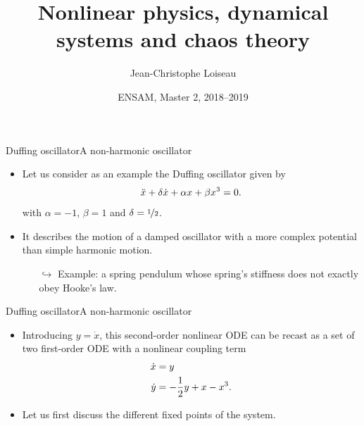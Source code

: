\documentclass[usenames,dvipsnames,svgnames,10pt,aspectratio=169]{beamer}
\title[Nonlinear Physics] %
{
	Nonlinear physics, dynamical \\ systems and chaos theory
}
\author[J.-Ch.~Loiseau] %
{
	Jean-Christophe Loiseau
}
\institute[unused]
{
	\url{jean-christophe.loiseau@ensam.eu} \\
	DynFluid, \\
	Arts et M\'etiers ParisTech, France
}
\date[unused]{ENSAM, Master 2, 2018--2019}
\begin{document}
\titleframe %


%
%
%
%

\begin{frame}[t, c]{Duffing oscillator}{A non-harmonic oscillator}
	\begin{itemize}
		\item Let us consider as an example the Duffing oscillator given by
		\begin{equation}
			\ddot{x} + \displaystyle \delta \dot{x} +  \alpha x  + \beta  x^3 = 0.
			\notag
		\end{equation}
		with $\alpha = -1$, $\beta = 1$ and $\delta = \nicefrac{1}{2}$.
		\bigskip

		\item It describes the motion of a damped oscillator with a more complex potential than simple harmonic motion.
		\begin{itemize}
			\item[$\hookrightarrow$] Example: a spring pendulum whose spring's stiffness does not exactly obey Hooke's law.
		\end{itemize}
	\end{itemize}

	\vspace{1cm}
\end{frame}

\begin{frame}[t, c]{Duffing oscillator}{A non-harmonic oscillator}
	\begin{itemize}
		\item Introducing $y = \dot{x}$, this second-order nonlinear ODE can be recast as a set of two first-order ODE with a nonlinear coupling term
		\begin{equation}
			\begin{aligned}
				\dot{x} & = y \\
				\dot{y} & = -\displaystyle \frac{1}{2} y +  x -  x^3.
			\end{aligned}
			\notag
		\end{equation}

		\bigskip

		\item Let us first discuss the different fixed points of the system.
	\end{itemize}

	\vspace{1cm}
\end{frame}
\end{document}
